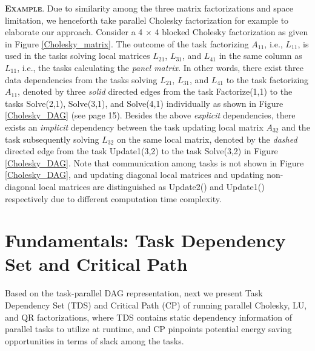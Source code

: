 \documentclass[12pt]{elsarticle}
\begin{document}
\vspace{1mm}
\noindent\textsc{\textbf{Example}}. Due to similarity among the three matrix factorizations and space limitation, we henceforth take parallel Cholesky factorization for example to elaborate our approach. Consider a 4 $\times$ 4 blocked Cholesky factorization as given in Figure \ref{Cholesky_matrix}. The outcome of the task factorizing $A_{11}$, i.e., $L_{11}$, is used in the tasks solving local matrices $L_{21}$, $L_{31}$, and $L_{41}$ in the same column as $L_{11}$, i.e., the tasks calculating the \emph{panel matrix}. In other words, there exist three data dependencies from the tasks solving $L_{21}$, $L_{31}$, and $L_{41}$ to the task factorizing $A_{11}$, denoted by three \emph{solid} directed edges from the task \textsf{Factorize(1,1)} to the tasks \textsf{Solve(2,1)}, \textsf{Solve(3,1)}, and \textsf{Solve(4,1)} individually as shown in Figure \ref{Cholesky_DAG} (see page 15). Besides the above \emph{explicit} dependencies, there exists an \emph{implicit} dependency between the task updating local matrix $A_{32}$ and the task subsequently solving $L_{32}$ on the same local matrix, denoted by the \emph{dashed} directed edge from the task \textsf{Update1(3,2)} to the task \textsf{Solve(3,2)} in Figure \ref{Cholesky_DAG}. Note that communication among tasks is not shown in Figure \ref{Cholesky_DAG}, and updating diagonal local matrices and updating non-diagonal local matrices are distinguished as \textsf{Update2()} and \textsf{Update1()} respectively due to different computation time complexity.


\section{Fundamentals: Task Dependency Set and Critical Path}

Based on the task-parallel DAG representation, next we present Task Dependency Set (TDS) and Critical Path (CP) of running parallel Cholesky, LU, and QR factorizations, where TDS contains static dependency information of parallel tasks to utilize at runtime, and CP pinpoints potential energy saving opportunities in terms of slack among the tasks.
\end{document}
